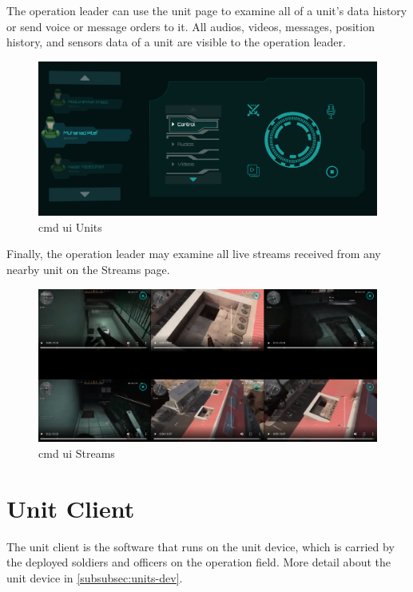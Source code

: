 The operation leader can use the unit page to examine all of a unit's data history or send voice or message orders to it. All audios, videos, messages, position history, and sensors data of a unit are visible to the operation leader. \begin{figure}
    \centering
    \includegraphics[width=15cm]{images/cmd-ui-units.png}
    \caption{\acrshort{cmd} \acrshort{ui} Units}
    \label{fig:cmd-ui-units}
\end{figure}


Finally, the operation leader may examine all live streams received from any nearby unit on the Streams page.

\begin{figure}
    \centering
    \includegraphics[width=15cm]{images/cmd-ui-streaming.png}
    \caption{\acrshort{cmd} \acrshort{ui} Streams}
    \label{fig:cmd-ui-streams}
\end{figure}


\section{Unit Client}
The unit client is the software that runs on the unit device, which is carried by the deployed soldiers and officers on the operation field.
More detail about the unit device in \ref{subsubsec:units-dev}.

